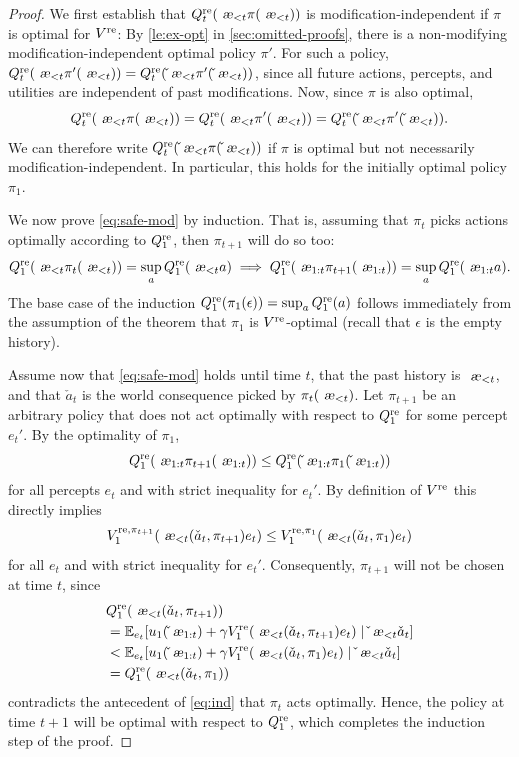 \documentclass[a4paper]{article}
\theoremstyle{definition}
\theoremstyle{remark}
\def\EE{{\mathbb{E}}}  %
\let\aechar\ae %
\renewcommand{\ae}{
\ifmmode\mathchoice{
	\mbox{\textsl{\aechar}}
}{
	\mbox{\textsl{\aechar}}
}{
	\mbox{\scriptsize\textsl{\aechar}}
}{
	\mbox{\scriptsize\textsl{\aechar}}
}\else\aechar\fi%
}                         %
\newcommand*{\Qre}[1][]{Q^{{\rm re} #1}}
\newcommand*{\Vre}[1][]{V^{{\rm re} #1}}
\renewcommand{\hat}{\check}
\begin{document}
\begin{proof}
  We first establish that $\Qre_t(\ae_{<t}\pi(\ae_{<t}))$
  is modification-independent if $\pi$ is optimal for $\Vre$:
  By \cref{le:ex-opt} in \cref{sec:omitted-proofs}, there is a non-modifying
  modification-independent
  optimal policy $\pi'$.
  For such a policy,
  $\Qre_t(\ae_{<t}\pi'(\ae_{<t}))=\Qre_t(\hat\ae_{<t}\pi'(\hat\ae_{<t}))$,
  since all future actions, percepts, and utilities are independent
  of past modifications.
  Now, since $\pi$ is also optimal,
  \[\Qre_t(\ae_{<t}\pi(\ae_{<t}))=\Qre_t(\ae_{<t}\pi'(\ae_{<t}))=
  \Qre_t(\hat\ae_{<t}\pi'(\hat\ae_{<t})).\]
  We can therefore write $\Qre_t(\hat\ae_{<t}\pi(\hat\ae_{<t}))$
  if $\pi$ is optimal but not necessarily
  modification-independent.
  In particular, this holds for the initially optimal
  policy $\pi_1$.

  We now prove \cref{eq:safe-mod} by induction.
  That is, assuming that $\pi_t$ picks actions optimally according to $\Qre_1$,
  then $\pi_{t+1}$ will do so too:
  \begin{equation}\label{eq:ind}
    \Qre_1(\ae_{<t}\pi_{t}(\ae_{<t}))=\sup_a\Qre_1(\ae_{<t}a)
    \implies
    \Qre_1(\ae_{1:t}\pi_{t+1}(\ae_{1:t}))=\sup_a\Qre_1(\ae_{1:t}a).
  \end{equation}
  The base case of the induction $\Qre_1(\pi_{1}(\epsilon))=\sup_a\Qre_1(a)$
  follows immediately from the assumption of the theorem that
  $\pi_1$ is $\Vre$-optimal (recall that $\epsilon$ is the empty history).

  Assume now that \cref{eq:safe-mod} holds until time $t$,
  that the past history is $\ae_{<t}$, and
  that $\hat a_t$ is the world consequence picked by $\pi_t(\ae_{<t})$.
  Let $\pi_{t+1}$ be an arbitrary policy that does not act optimally with
  respect to $\Qre_1$ for some percept $e_{t}'$.
  By the optimality of $\pi_1$, %
  \[
    \Qre_1(\ae_{1:t}\pi_{t+1}(\ae_{1:t})) \leq \Qre_1(\hat\ae_{1:t}\pi_1(\hat\ae_{1:t}))
  \]
  for all percepts $e_t$ and with strict inequality for $e_{t}'$.
  By definition of $\Vre$ this directly implies
  \[
    \Vre[,\pi_{t+1}]_1(\ae_{<t}(\hat a_t,\pi_{t+1})e_t) \leq
    \Vre[,\pi_{1}]_1(\ae_{<t}(\hat a_t,\pi_{1})e_t)
  \]
  for all $e_{t}$ and with strict inequality for $e_t'$.
  Consequently, $\pi_{t+1}$ will not be chosen at time $t$, since
  \begin{align*}
    &\Qre_1(\ae_{<t}(\hat a_t,\pi_{t+1}))\\
    &= \EE_{e_t}[u_1(\hat\ae_{1:t}) +  \gamma\Vre_1(\ae_{<t}(\hat a_t,\pi_{t+1})e_t)
      \mid \hat\ae_{<t}\hat a_t ] \\
    &< \EE_{e_t}[u_1(\hat\ae_{1:t}) +  \gamma\Vre_1(\ae_{<t}(\hat a_t,\pi_{1})e_t)
      \mid \hat\ae_{<t}\hat a_t ] \\
    &= \Qre_1(\ae_{<t}(\hat a_t,\pi_{1}))
  \end{align*}
  contradicts the antecedent of \cref{eq:ind} that $\pi_t$ acts optimally.
  Hence, the policy at time $t+1$ will be optimal with respect to $\Qre_1$,
  which completes the induction step of the proof.
\end{proof}
\end{document}
